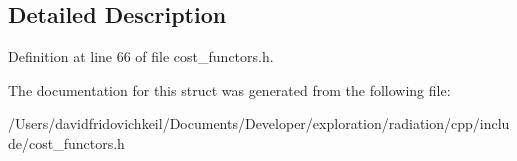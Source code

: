\subsection{Detailed Description}


Definition at line 66 of file cost\+\_\+functors.\+h.



The documentation for this struct was generated from the following file\+:\begin{DoxyCompactItemize}
\item 
/\+Users/davidfridovichkeil/\+Documents/\+Developer/exploration/radiation/cpp/include/cost\+\_\+functors.\+h\end{DoxyCompactItemize}
